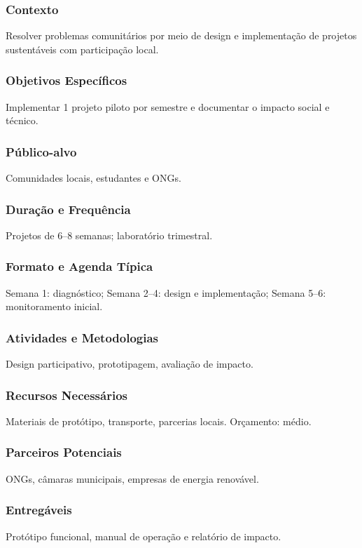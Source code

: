 \documentclass[12pt,a4paper]{article}
\begin{document}
\subsubsection*{Contexto}
Resolver problemas comunitários por meio de design e implementação de projetos sustentáveis com participação local.

\subsubsection*{Objetivos Específicos}
Implementar 1 projeto piloto por semestre e documentar o impacto social e técnico.

\subsubsection*{Público-alvo}
Comunidades locais, estudantes e ONGs.

\subsubsection*{Duração e Frequência}
Projetos de 6–8 semanas; laboratório trimestral.

\subsubsection*{Formato e Agenda Típica}
Semana 1: diagnóstico; Semana 2–4: design e implementação; Semana 5–6: monitoramento inicial.

\subsubsection*{Atividades e Metodologias}
Design participativo, prototipagem, avaliação de impacto.

\subsubsection*{Recursos Necessários}
Materiais de protótipo, transporte, parcerias locais. Orçamento: médio.

\subsubsection*{Parceiros Potenciais}
ONGs, câmaras municipais, empresas de energia renovável.

\subsubsection*{Entregáveis}
Protótipo funcional, manual de operação e relatório de impacto.
\end{document}
